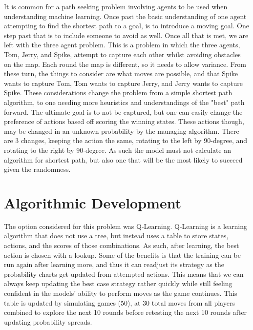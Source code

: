 \documentclass[letterpaper, 10 pt, conference]{ieeeconf}   %
\begin{document}
It is common for a path seeking problem involving agents to be used when understanding machine learning. Once past the basic understanding of one agent attempting
to find the shortest path to a goal, is to introduce a moving goal. One step past that is to include someone to avoid as well. Once all that is met, we are left with the three agent problem. This
is a problem in which the three agents, Tom, Jerry, and Spike, attempt to capture each other whilst avoiding obstacles on the map. Each round the map is different, so it needs to allow variance.
From these turn, the things to consider are what moves are possible, and that Spike wants to capture Tom, Tom wants to capture Jerry, and Jerry wants to capture Spike. These considerations
change the problem from a simple shortest path algorithm, to one needing more heuristics and understandings of the "best" path forward. The ultimate goal is to not be captured,
but one can easily change the preference of actions based off scoring the winning states. These actions though, may be changed in an unknown probability by the managing algorithm.
There are 3 changes, keeping the action the same, rotating to the left by 90-degree, and rotating to the right by 90-degree. As such the model must not calculate
an algorithm for shortest path, but also one that will be the most likely to succeed given the randomness.

\section{Algorithmic Development}
The option considered for this problem was Q-Learning. Q-Learning is a learning algorithm that does not use a tree, but instead uses a table to store
states, actions, and the scores of those combinations. As such, after learning, the best action is chosen with a lookup. Some of the benefits is that
the training can be run again after learning more, and thus it can readjust its strategy as the probability charts get updated from attempted actions.
This means that we can always keep updating the best case strategy rather quickly while still feeling confident in the models' ability to perform moves as the
game continues. This table is updated by simulating games (50), at 30 total moves from all players combined to explore the next 10 rounds before retesting the
next 10 rounds after updating probability spreads.
\end{document}
